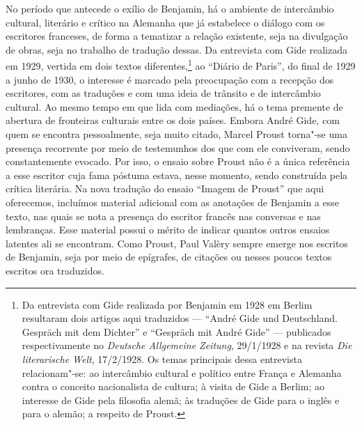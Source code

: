 No período que antecede o exílio de Benjamin, há o ambiente de
intercâmbio cultural, literário e crítico na Alemanha que já estabelece
o diálogo com os escritores franceses, de forma a tematizar a relação
existente, seja na divulgação de obras, seja no trabalho de tradução
dessas. Da entrevista com Gide realizada em 1929, vertida em dois textos
diferentes,\footnote{Da entrevista com Gide realizada por Benjamin em
  1928 em Berlim resultaram dois artigos aqui traduzidos --- ``André Gide
  und Deutschland. Gespräch mit dem Dichter'' e ``Gespräch mit André
  Gide'' --- publicados respectivamente no \emph{Deutsche Allgemeine
  Zeitung}, 29/1/1928 e na revista \emph{Die literarische Welt},
  17/2/1928. Os temas principais dessa entrevista relacionam"-se: ao
  intercâmbio cultural e político entre França e Alemanha contra o
  conceito nacionalista de cultura; à visita de Gide a Berlim; ao
  interesse de Gide pela filosofia alemã; às traduções de Gide para o
  inglês e para o alemão; a respeito de Proust.} ao ``Diário de %
Paris'', do final de 1929 a junho de 1930, o interesse é marcado pela
preocupação com a recepção dos escritores, com as traduções e com uma
ideia de trânsito e de intercâmbio cultural. Ao mesmo tempo em que lida
com mediações, há o tema premente de abertura de fronteiras culturais
entre os dois países. Embora André Gide, com quem se encontra
pessoalmente, seja muito citado, Marcel Proust torna"-se uma presença
recorrente por meio de testemunhos dos que com ele conviveram, sendo
constantemente evocado. Por isso, o ensaio sobre Proust não é a única
referência a esse escritor cuja fama póstuma estava, nesse momento,
sendo construída pela crítica literária. Na nova tradução do ensaio
``Imagem de Proust'' que aqui oferecemos, incluímos material adicional
com as anotações de Benjamin a esse texto, nas quais se nota a presença
do escritor francês nas conversas e nas lembranças. Esse material possui
o mérito de indicar quantos outros ensaios latentes ali se encontram.
Como Proust, Paul Valèry sempre emerge nos escritos de Benjamin, seja
por meio de epígrafes, de citações ou nesses poucos textos escritos ora
traduzidos.

